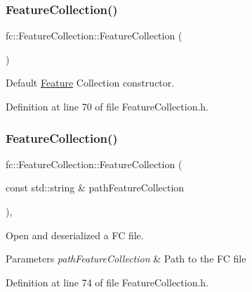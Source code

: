 \subsubsection{\texorpdfstring{Feature\+Collection()}{FeatureCollection()}\hspace{0.1cm}{\footnotesize\ttfamily [1/3]}}
{\footnotesize\ttfamily fc\+::\+Feature\+Collection\+::\+Feature\+Collection (\begin{DoxyParamCaption}{ }\end{DoxyParamCaption})\hspace{0.3cm}{\ttfamily [inline]}}



Default \hyperlink{classfc_1_1Feature}{Feature} Collection constructor. 



Definition at line 70 of file Feature\+Collection.\+h.

\mbox{\label{classfc_1_1FeatureCollection_aa5d92c395512b9dd5d6c240fa150f992}} 
\subsubsection{\texorpdfstring{Feature\+Collection()}{FeatureCollection()}\hspace{0.1cm}{\footnotesize\ttfamily [2/3]}}
{\footnotesize\ttfamily fc\+::\+Feature\+Collection\+::\+Feature\+Collection (\begin{DoxyParamCaption}\item[{const std\+::string \&}]{path\+Feature\+Collection }\end{DoxyParamCaption})\hspace{0.3cm}{\ttfamily [inline]}, {\ttfamily [explicit]}}



Open and deserialized a FC file. 


\begin{DoxyParams}{Parameters}
{\em path\+Feature\+Collection} & Path to the FC file \\
\hline
\end{DoxyParams}


Definition at line 74 of file Feature\+Collection.\+h.

